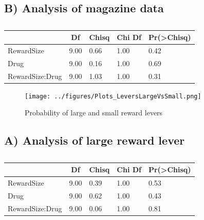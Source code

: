 \documentclass[
]{article}
\begin{document}
\hypertarget{b-analysis-of-magazine-data}{%
\subsection{B) Analysis of magazine
data}\label{b-analysis-of-magazine-data}}

\begin{table}[tbp]

\begin{center}
\begin{threeparttable}

\caption{\label{tab:Analysis 2: Probability of both levers }}

\begin{tabular}{lllll}
\toprule
 & \multicolumn{1}{c}{Df} & \multicolumn{1}{c}{Chisq} & \multicolumn{1}{c}{Chi Df} & \multicolumn{1}{c}{Pr(>Chisq)}\\
\midrule
RewardSize & 9.00 & 0.66 & 1.00 & 0.42\\
Drug & 9.00 & 0.16 & 1.00 & 0.69\\
RewardSize:Drug & 9.00 & 1.03 & 1.00 & 0.31\\
\bottomrule
\end{tabular}

\end{threeparttable}
\end{center}

\end{table}

\begin{figure}
\centering
\texttt{[image: ../figures/Plots\_LeversLargeVsSmall.png]}
\caption{Probability of large and small reward levers}
\end{figure}

\hypertarget{a-analysis-of-large-reward-lever}{%
\subsection{A) Analysis of large reward
lever}\label{a-analysis-of-large-reward-lever}}

\begin{table}[tbp]

\begin{center}
\begin{threeparttable}

\caption{\label{tab:Analysis 2: Probability of both levers }}

\begin{tabular}{lllll}
\toprule
 & \multicolumn{1}{c}{Df} & \multicolumn{1}{c}{Chisq} & \multicolumn{1}{c}{Chi Df} & \multicolumn{1}{c}{Pr(>Chisq)}\\
\midrule
RewardSize & 9.00 & 0.39 & 1.00 & 0.53\\
Drug & 9.00 & 0.62 & 1.00 & 0.43\\
RewardSize:Drug & 9.00 & 0.06 & 1.00 & 0.81\\
\bottomrule
\end{tabular}

\end{threeparttable}
\end{center}

\end{table}
\end{document}

